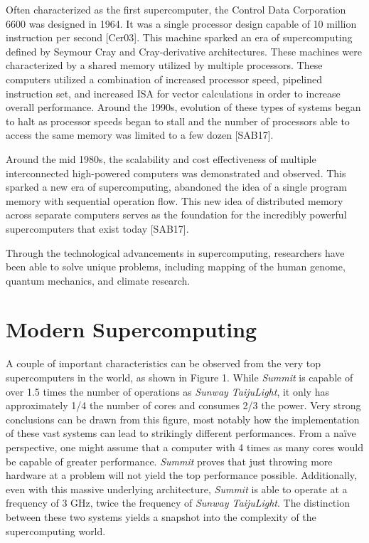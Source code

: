 \documentclass[12pt, letterpaper]{article}
\begin{document}
Often characterized as the first supercomputer, the Control Data Corporation 6600 was designed in 1964. It was a single processor design capable of 10 million instruction per second [Cer03]. This machine sparked an era of supercomputing defined by Seymour Cray and Cray-derivative architectures. These machines were characterized by a shared memory utilized by multiple processors. These computers utilized a combination of increased processor speed, pipelined instruction set, and increased ISA for vector calculations in order to increase overall performance. Around the 1990s, evolution of these types of systems began to halt as processor speeds began to stall and the number of processors able to access the same memory was limited to a few dozen [SAB17].

Around the mid 1980s, the scalability and cost effectiveness of multiple interconnected high-powered computers was demonstrated and observed. This sparked a new era of supercomputing, abandoned the idea of a single program memory with sequential operation flow. This new idea of distributed memory across separate computers serves as the foundation for the incredibly powerful supercomputers that exist today [SAB17].

Through the technological advancements in supercomputing, researchers have been able to solve unique problems, including mapping of the human genome, quantum mechanics, and climate research.

\section{Modern Supercomputing}

A couple of important characteristics can be observed from the very top supercomputers in the world, as shown in Figure 1. While \textit{Summit} is capable of over 1.5 times the number of operations as \textit{Sunway TaijuLight}, it only has approximately 1/4 the number of cores and consumes 2/3 the power. Very strong conclusions can be drawn from this figure, most notably how the implementation of these vast systems can lead to strikingly different performances. From a naïve perspective, one might assume that a computer with 4 times as many cores would be capable of greater performance. \textit{Summit} proves that just throwing more hardware at a problem will not yield the top performance possible. Additionally, even with this massive underlying architecture, \textit{Summit} is able to operate at a frequency of 3 GHz, twice the frequency of \textit{Sunway TaijuLight}. The distinction between these two systems yields a snapshot into the complexity of the supercomputing world.
\end{document}
